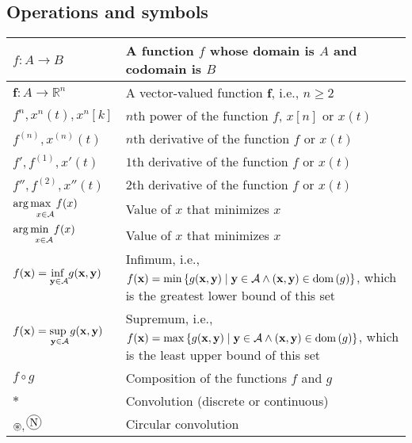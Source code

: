 \documentclass{article}
\begin{document}
\subsection{Operations and symbols}
\begin{xltabular}{\textwidth}{XX}
    \(f: A \rightarrow B\)& A function \(f\) whose domain is \(A\) and codomain is \(B\)\\ \hline
    \(\mathbf{f}: A \rightarrow \mathbb{R}^n\)& A vector-valued function \(\mathbf{f}\), i.e., \(n \geq 2\)\\ \hline
    \(f^{n}, x^{n}(t), x^{n}[k]\) & \(n\)th power of the function \(f\), \(x[n]\) or \(x(t)\)\\ \hline
    \(f^{\left( n \right)},  x^{(n)}(t)\) & \(n\)th derivative of the function \(f\) or \(x(t)\)\\ \hline
    \(f', f^{\left( 1 \right)}, x'(t)\) & \(1\)th derivative of the function \(f\) or \(x(t)\)\\ \hline
    \(f'', f^{\left( 2 \right)}, x''(t)\) & \(2\)th derivative of the function \(f\) or \(x(t)\)\\ \hline
    \(\argmax[x \in \mathcal{A}]{f(x)} \) & Value of \(x\) that minimizes \(x\)\\ \hline
    \( \argmin[x \in \mathcal{A}]{f(x)} \) & Value of \(x\) that minimizes \(x\)\\ \hline
    \(f(\mathbf{x}) = \underset{\mathbf{y} \in \mathcal{A}}{\textnormal{inf }} g(\mathbf{x},\mathbf{y})\) & Infimum, i.e., \(f(\mathbf{x}) = \min{\left\{ g(\mathbf{x}, \mathbf{y}) \mid \mathbf{y} \in \mathcal{A} \wedge \left( \mathbf{x}, \mathbf{y} \right) \in \ensuremath{\operatorname{dom}\left(g\right)} \right\}}\), which is the greatest lower bound of this set \cite{boydConvexOptimization2004}\\ \hline
    \(f(\mathbf{x}) = \underset{\mathbf{y} \in \mathcal{A}}{\textnormal{sup }} g(\mathbf{x},\mathbf{y})\) & Supremum, i.e., \(f(\mathbf{x}) = \max{\left\{ g(\mathbf{x}, \mathbf{y}) \mid \mathbf{y} \in \mathcal{A} \wedge \left( \mathbf{x}, \mathbf{y} \right) \in \ensuremath{\operatorname{dom}\left(g\right)} \right\}}\), which is the least upper bound of this set \cite{boydConvexOptimization2004}\\ \hline
    \(f \circ g\) & Composition of the functions \(f\) and \(g\)\\ \hline
    \(*\) & Convolution (discrete or continuous)\\ \hline
    \(\circledast, \circconv{N}\) & Circular convolution \cite{oppenheimDiscreteTimeSignalProcessing2009,dinizDigitalSignalProcessing2010}\\
\end{xltabular}
\end{document}
